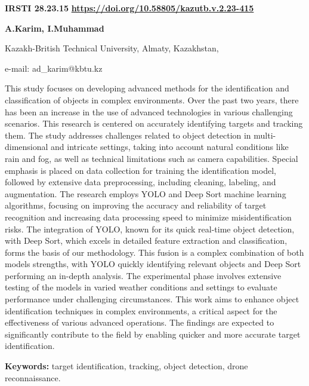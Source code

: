 \newpage
{}
{\bfseries IRSTI 28.23.15}
\hfill {\bfseries \href{https://doi.org/10.58805/kazutb.v.2.23-415}{https://doi.org/10.58805/kazutb.v.2.23-415}}


\begin{center}
{\bfseries A.Karim\envelope, I.Muhammad}

Kazakh-British Technical University, Almaty, Kazakhstan,

e-mail: ad\_karim@kbtu.kz
\end{center}

This study focuses on developing advanced methods for the identification
and classification of objects in complex environments. Over the past two
years, there has been an increase in the use of advanced technologies in
various challenging scenarios. This research is centered on accurately
identifying targets and tracking them. The study addresses challenges
related to object detection in multi-dimensional and intricate settings,
taking into account natural conditions like rain and fog, as well as
technical limitations such as camera capabilities. Special emphasis is
placed on data collection for training the identification model,
followed by extensive data preprocessing, including cleaning, labeling,
and augmentation. The research employs YOLO and Deep Sort machine
learning algorithms, focusing on improving the accuracy and reliability
of target recognition and increasing data processing speed to minimize
misidentification risks. The integration of YOLO, known for its quick
real-time object detection, with Deep Sort, which excels in detailed
feature extraction and classification, forms the basis of our
methodology. This fusion is a complex combination of both
models\textquotesingle{} strengths, with YOLO quickly identifying
relevant objects and Deep Sort performing an in-depth analysis. The
experimental phase involves extensive testing of the models in varied
weather conditions and settings to evaluate performance under
challenging circumstances. This work aims to enhance object
identification techniques in complex environments, a critical aspect for
the effectiveness of various advanced operations. The findings are
expected to significantly contribute to the field by enabling quicker
and more accurate target identification.

{\bfseries Keywords:} target identification, tracking, object detection,
drone reconnaissance.

